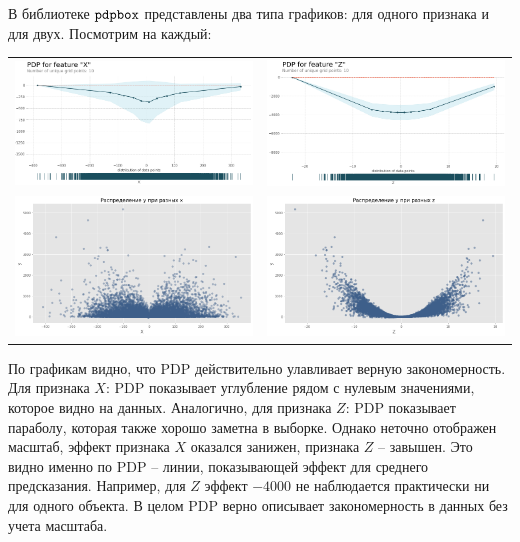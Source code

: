 В библиотеке $\verb|pdpbox|$ представлены два типа графиков: для одного признака и для двух. Посмотрим на каждый:

\noindent
\begin{tabular}{c|c}
	\arrayrulecolor[rgb]{0.8,0.85,1}
	\includegraphics[width=0.48\linewidth]{pics/pdpx.png} & \includegraphics[width=0.48\linewidth]{pics/pdpz.png} \\
	\includegraphics[width=0.48\linewidth]{pics/yx.png} & \includegraphics[width=0.48\linewidth]{pics/yz.png} \\
\end{tabular}

По графикам видно, что PDP действительно улавливает верную закономерность. Для признака $X$: PDP показывает углубление рядом с нулевым значениями, которое видно на данных. Аналогично, для признака $Z$: PDP показывает параболу, которая также хорошо заметна в выборке. Однако неточно отображен масштаб, эффект признака $X$ оказался занижен, признака $Z$ -- завышен. Это видно именно по PDP -- линии, показывающей эффект для среднего предсказания. Например, для $Z$ эффект $-4000$ не наблюдается практически ни для одного объекта. В целом PDP верно описывает закономерность в данных без учета масштаба.


